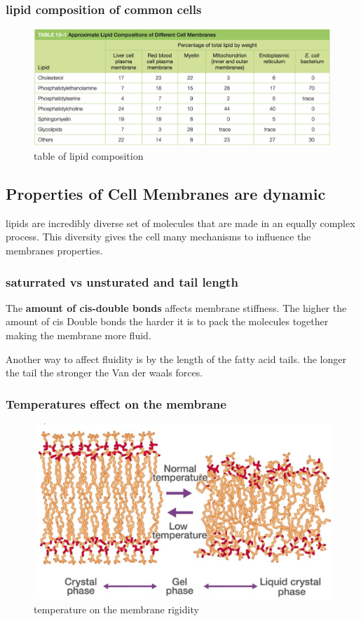 \documentclass[../main.tex]{subfiles}
\begin{document}
        \subsubsection{lipid composition of common cells}
        \begin{figure}[H]
            \centering
            \includegraphics[width=\linewidth]{Sum_Cell_Bio_II//lectures//cbII1/table.png}
            \caption{table of lipid composition}
            \label{fig:lipidComposition}
        \end{figure}
        
        

            

    

    \subsection{Properties of Cell Membranes are dynamic}
        lipids are incredibly diverse set of molecules that are made in an equally complex process. This diversity gives the cell many mechanisms to influence the membranes properties.
        
        \subsubsection{saturrated vs unsturated and tail length}
        The \textbf{amount of cis-double bonds} affects membrane stiffness. The higher the amount of cis Double bonds the harder it is to pack the molecules together making the membrane more fluid. 
        \par
        Another way to affect fluidity is by the length of the fatty acid tails. the longer the tail the stronger the Van der waals forces.


        \subsubsection{Temperatures effect on the membrane}
        \begin{figure}[H]
            \centering
            \includegraphics[width=0.4\linewidth]{temp.png}
            \caption{temperature on the membrane rigidity}
            \label{fig:enter-label}
        \end{figure}
\end{document}

